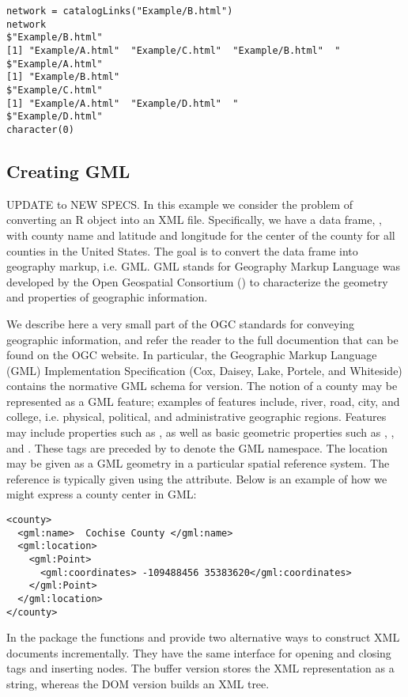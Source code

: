 \small{
\begin{verbatim}
network = catalogLinks("Example/B.html")
network
$"Example/B.html"
[1] "Example/A.html"  "Example/C.html"  "Example/B.html"  "
$"Example/A.html"
[1] "Example/B.html"  
$"Example/C.html"
[1] "Example/A.html"  "Example/D.html"  "
$"Example/D.html"
character(0)
\end{verbatim}
}


\subsection{Creating GML}
UPDATE to NEW SPECS.
In this example we consider the problem of converting an R 
object into an XML file.
Specifically, we have a data frame, , 
with county name and latitude and longitude 
for the center of the county for all counties in the United States.
The goal is to convert the data frame into geography markup, i.e. GML. 
GML stands for Geography Markup Language was developed by
the Open Geospatial Consortium ()
to characterize the geometry and properties of geographic information.

We describe here a very small part of the OGC standards for conveying
geographic information, and refer the reader to the full documention
that can be found on the OGC website. 
In particular, the Geographic Markup Language (GML)
Implementation Specification (Cox, Daisey, Lake, Portele, and Whiteside)
contains the normative GML schema for version.
The notion of a county may be represented as a GML feature;  
examples of features include, river, road, city, and college,
i.e. physical, political, and administrative geographic regions.  
Features may include properties such as ,
as well as basic geometric properties such as 
, , and .
These tags are preceded by  to denote the GML
namespace.
The location may be given as a GML geometry in a particular
spatial reference system.  The reference is typically given
using the  attribute.
Below is an example of how we might express a county center
in GML:

\begin{verbatim}
<county>
  <gml:name>  Cochise County </gml:name>
  <gml:location>
    <gml:Point>
      <gml:coordinates> -109488456 35383620</gml:coordinates>
    </gml:Point>
  </gml:location>
</county>
\end{verbatim}

In the  package the functions
 and  
provide two alternative ways to construct XML documents incrementally.  
They have the same interface for opening and closing tags and 
inserting nodes.  
The buffer version stores the XML representation as a string,
whereas the DOM version builds an XML tree.

